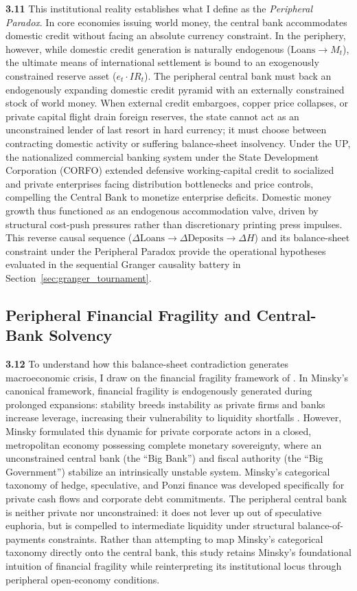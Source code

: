 \textbf{3.11} This institutional reality establishes what I define as the \emph{Peripheral Paradox}. In core economies issuing world money, the central bank accommodates domestic credit without facing an absolute currency constraint. In the periphery, however, while domestic credit generation is naturally endogenous ($\text{Loans} \to M_t$), the ultimate means of international settlement is bound to an exogenously constrained reserve asset ($e_t \cdot IR_t$). The peripheral central bank must back an endogenously expanding domestic credit pyramid with an externally constrained stock of world money. When external credit embargoes, copper price collapses, or private capital flight drain foreign reserves, the state cannot act as an unconstrained lender of last resort in hard currency; it must choose between contracting domestic activity or suffering balance-sheet insolvency. Under the UP, the nationalized commercial banking system under the State Development Corporation (CORFO) extended defensive working-capital credit to socialized and private enterprises facing distribution bottlenecks and price controls, compelling the Central Bank to monetize enterprise deficits. Domestic money growth thus functioned as an endogenous accommodation valve, driven by structural cost-push pressures rather than discretionary printing press impulses. This reverse causal sequence ($\Delta \text{Loans} \to \Delta \text{Deposits} \to \Delta H$) and its balance-sheet constraint under the Peripheral Paradox provide the operational hypotheses evaluated in the sequential Granger causality battery in Section~\ref{sec:granger_tournament}.

\subsection{Peripheral Financial Fragility and Central-Bank Solvency}
\label{sec:B5_foley_chamorro_minsky}

\textbf{3.12} To understand how this balance-sheet contradiction generates macroeconomic crisis, I draw on the financial fragility framework of \citet{Minsky1986}. In Minsky's canonical framework, financial fragility is endogenously generated during prolonged expansions: stability breeds instability as private firms and banks increase leverage, increasing their vulnerability to liquidity shortfalls \citep{Kregel2008}. However, Minsky formulated this dynamic for private corporate actors in a closed, metropolitan economy possessing complete monetary sovereignty, where an unconstrained central bank (the ``Big Bank'') and fiscal authority (the ``Big Government'') stabilize an intrinsically unstable system. Minsky's categorical taxonomy of hedge, speculative, and Ponzi finance was developed specifically for private cash flows and corporate debt commitments. The peripheral central bank is neither private nor unconstrained: it does not lever up out of speculative euphoria, but is compelled to intermediate liquidity under structural balance-of-payments constraints. Rather than attempting to map Minsky's categorical taxonomy directly onto the central bank, this study retains Minsky's foundational intuition of financial fragility while reinterpreting its institutional locus through peripheral open-economy conditions.

